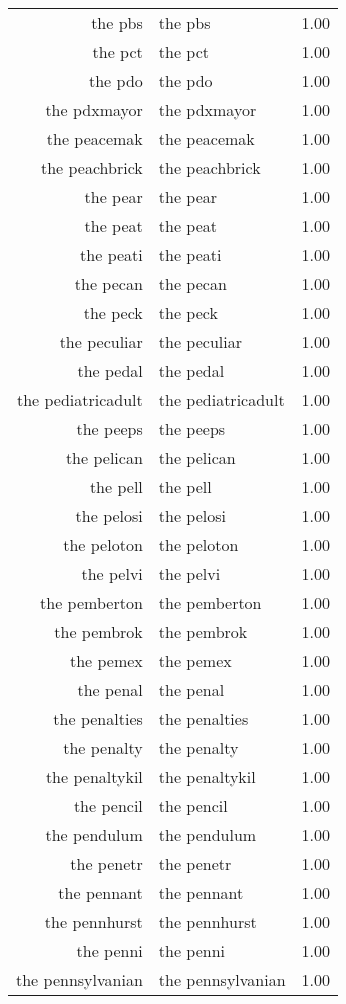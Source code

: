 \begin{table}[ht]
\begin{tabular}{rlr}
  the pbs & the pbs & 1.00 \\ 
  the pct & the pct & 1.00 \\ 
  the pdo & the pdo & 1.00 \\ 
  the pdxmayor & the pdxmayor & 1.00 \\ 
  the peacemak & the peacemak & 1.00 \\ 
  the peachbrick & the peachbrick & 1.00 \\ 
  the pear & the pear & 1.00 \\ 
  the peat & the peat & 1.00 \\ 
  the peati & the peati & 1.00 \\ 
  the pecan & the pecan & 1.00 \\ 
  the peck & the peck & 1.00 \\ 
  the peculiar & the peculiar & 1.00 \\ 
  the pedal & the pedal & 1.00 \\ 
  the pediatricadult & the pediatricadult & 1.00 \\ 
  the peeps & the peeps & 1.00 \\ 
  the pelican & the pelican & 1.00 \\ 
  the pell & the pell & 1.00 \\ 
  the pelosi & the pelosi & 1.00 \\ 
  the peloton & the peloton & 1.00 \\ 
  the pelvi & the pelvi & 1.00 \\ 
  the pemberton & the pemberton & 1.00 \\ 
  the pembrok & the pembrok & 1.00 \\ 
  the pemex & the pemex & 1.00 \\ 
  the penal & the penal & 1.00 \\ 
  the penalties & the penalties & 1.00 \\ 
  the penalty & the penalty & 1.00 \\ 
  the penaltykil & the penaltykil & 1.00 \\ 
  the pencil & the pencil & 1.00 \\ 
  the pendulum & the pendulum & 1.00 \\ 
  the penetr & the penetr & 1.00 \\ 
  the pennant & the pennant & 1.00 \\ 
  the pennhurst & the pennhurst & 1.00 \\ 
  the penni & the penni & 1.00 \\ 
  the pennsylvanian & the pennsylvanian & 1.00 \\ 

\end{tabular}
\end{table}
